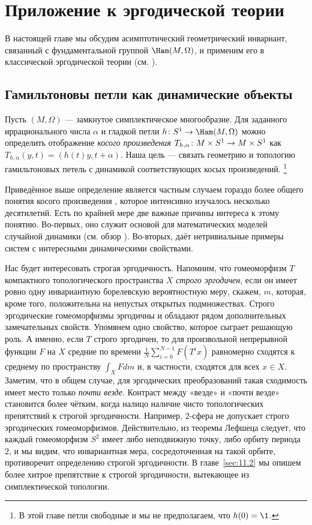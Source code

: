 \chapter[Эргодическая теория]{Приложение к эргодической теории}\label{chap:11}

В настоящей главе мы обсудим асимптотический геометрический инвариант,
связанный с фундаментальной группой $\Ham(M, \Omega)$, и применим его
в классической эргодической теории (см. \cite{P9}). 

\section{Гамильтоновы петли как динамические объекты}\label{sec:11.1}

Пусть $(M,\Omega)$ — замкнутое симплектическое многообразие.
Для заданного иррационального числа $\alpha$ и гладкой петли $h\:S^1\z\to\Ham(M,\Omega)$ можно определить отображение \emph{косого произведения} $T_{h,\alpha} \: M \times S^1 \z\to M\times S^1$ как $T_{h,\alpha}(y,t)=(h(t)y,t+\alpha)$.
Наша цель — связать геометрию и топологию гамильтоновых петель с динамикой соответствующих косых произведений.%
\footnote{В этой главе петли свободные и мы не предполагаем, что $h(0) = \1$.}

Приведённое выше определение является частным случаем гораздо более
общего понятия косого произведения  \cite[с. 231]{CFS}, которое
интенсивно изучалось несколько десятилетий. 
Есть по крайней мере две важные причины интереса к этому понятию.
Во-первых, оно служит основой для математических моделей случайной
динамики (см. обзор \cite{Ki}). 
Во-вторых, даёт нетривиальные примеры систем с интересными
динамическими свойствами. 

Нас будет интересовать строгая эргодичность.
Напомним, что гомеоморфизм $T$ компактного топологического пространства $X$ \emph{строго эргодичен}, если он имеет ровно одну инвариантную борелевскую вероятностную меру, скажем, $m$, которая, кроме того, положительна на непустых открытых подмножествах. 
Строго эргодические гомеоморфизмы эргодичны и обладают рядом
дополнительных замечательных свойств. 
Упомянем одно свойство, которое сыграет решающую роль.
А именно, если $T$ строго эргодичен, то для произвольной непрерывной
функции $F$ на $X$ средние по времени
$\tfrac1N\sum_{i=0}^{N-1}F(T^ix)$ равномерно сходятся к среднему по
пространству $\int_XFdm$ и, в частности, сходятся для всех $x \in X$. 
Заметим, что в общем случае, для эргодических преобразований такая сходимость
имеет место только {}\emph{почти везде}. 
Контраст между «везде» и «почти везде» становится более чётким, когда
налицо наличие чисто топологических препятствий к строгой
эргодичности. 
Например, 2-сфера не допускает строго эргодических гомеоморфизмов.
Действительно, из теоремы Лефшеца следует, что каждый гомеоморфизм
$S^2$ имеет либо неподвижную точку, либо орбиту периода $2$, и мы
видим, что инвариантная мера, сосредоточенная на такой орбите,
противоречит определению строгой эргодичности. 
В главе~\ref{sec:11.2} мы опишем более хитрое препятствие к строгой
эргодичности, вытекающее из симплектической топологии. 

